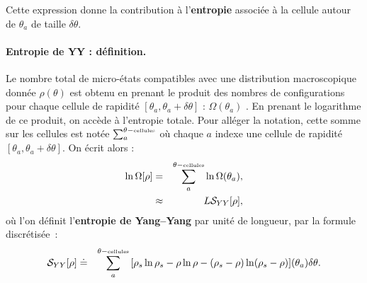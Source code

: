 Cette expression donne la contribution  à l’{\bf entropie}  associée à la cellule autour de $\theta_a$ de taille $\delta \theta$.

\paragraph{Entropie de \acrlong{YY} : définition.}



Le nombre total de micro-états compatibles avec une distribution macroscopique donnée $\rho(\theta)$ est obtenu en prenant le produit des nombres de configurations pour chaque cellule de rapidité $[\theta_a, \theta_a + \delta \theta]$ : $ \Omega(\theta_a)$ .
En prenant le logarithme de ce produit, on accède à l'entropie totale. Pour alléger la notation, cette somme sur les cellules est notée
\(
	\sum_a^{\theta-\mbox{\tiny cellules}}	
\)
où chaque $a$ indexe une cellule de rapidité $[\theta_a, \theta_a + \delta\theta]$.
On écrit alors :
\begin{eqnarray}
    \ln \Omega[\rho] & = & \sum_a^{\theta-\mbox{\tiny cellules}} \ln \Omega(\theta_a), \\
    & \approx &   L\mathcal{S}_{YY} [ \rho ] , 	
\end{eqnarray}
où l’on définit l’\textbf{entropie de Yang–Yang} par unité de longueur,  par la formule discrétisée :
\begin{eqnarray}
    \mathcal{S}_{YY}[\rho] & \doteq & \sum_a^{\theta-\mbox{\tiny cellules}} \, [ \rho_s\ln \rho_s - \rho \ln \rho - ( \rho_s - \rho ) \ln ( \rho_s - \rho ) ] (\theta_a) \delta \theta .
\end{eqnarray}


